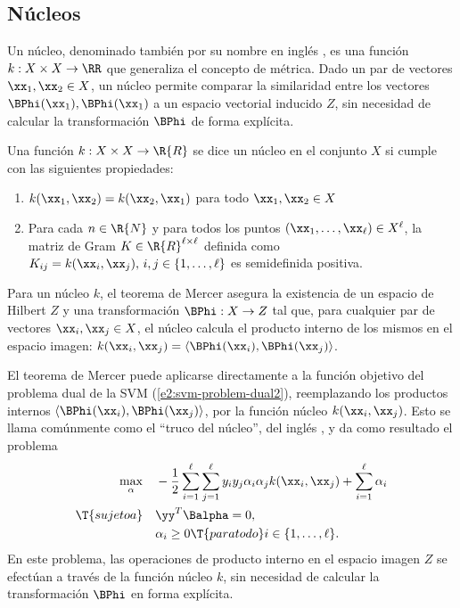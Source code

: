 %
%
\subsection{Núcleos}
%
Un núcleo, denominado también por su nombre en inglés , es
una función $k:X\times{}X\rightarrow{}\RR$ \cite{stewart} que
generaliza el concepto de métrica.  Dado un par de vectores
$\xx_1,\xx_2\in{}X$, un núcleo permite comparar la similaridad entre
los vectores $\BPhi(\xx_1),\BPhi(\xx_1)$  a un
espacio vectorial inducido $Z$, sin necesidad de calcular la
transformación $\BPhi$ de forma explícita.
%
\begin{definicion}[Núcleo]
  Una función $k:X\times{}X\rightarrow{}\R{R}$ se dice un núcleo
  en el conjunto $X$ si cumple con las siguientes propiedades:
  \begin{enumerate}
  \item $k(\xx_1,\xx_2)=k(\xx_2,\xx_1)$ para todo $\xx_1,\xx_2\in{}X$
  \item Para cada $n\in\R{N}$ y para todos los puntos
    $(\xx_1,\ldots,\xx_\ell)\in{}X^\ell$, la matriz de Gram
    $K\in\R{R}^{\ell\times\ell}$ definida como
    $K_{ij}=k(\xx_i,\xx_j),\,i,j\in\{1,\ldots,\ell\}$ es semidefinida
    positiva.
  \end{enumerate}
\end{definicion}
%
Para un núcleo $k$, el teorema de Mercer \cite{mercer} asegura la
existencia de un espacio de Hilbert $Z$ y una transformación
$\BPhi:X\rightarrow{}Z$ tal que, para cualquier par de vectores
$\xx_i,\xx_j\in{}X$, el núcleo calcula el producto interno de los
mismos en el espacio imagen:
$k(\xx_i,\xx_j)=\langle\BPhi(\xx_i),\BPhi(\xx_j)\rangle$.

El teorema de Mercer puede aplicarse directamente a la función
objetivo del problema dual de la SVM (\ref{e2:svm-problem-dual2}),
reemplazando los productos internos
$\left\langle\BPhi(\xx_i),\BPhi(\xx_j)\right\rangle$, por la función
núcleo $k(\xx_i,\xx_j)$. Esto se llama comúnmente como el ``truco del
núcleo'', del inglés , y da como resultado el problema
%
\begin{align}
  \begin{split}
    \max_\alpha &\quad
    -\frac{1}{2}\sum_{i=1}^\ell\sum_{j=1}^\ell y_iy_j\alpha_i\alpha_j
    k(\xx_i,\xx_j) + \sum_{i=1}^{\ell} \alpha_i \\
    \T{sujeto a} &\quad \yy^T\Balpha = 0, \\
    &\quad \alpha_i \geq 0\T{ para todo } i\in\{1,\ldots,\ell\}.
  \end{split}
  \label{e2:svm-problem-kernel}
\end{align}
%
En este problema, las operaciones de producto interno en el espacio
imagen $Z$ se efectúan a través de la función núcleo $k$, sin
necesidad de calcular la transformación $\BPhi$ en forma explícita.

